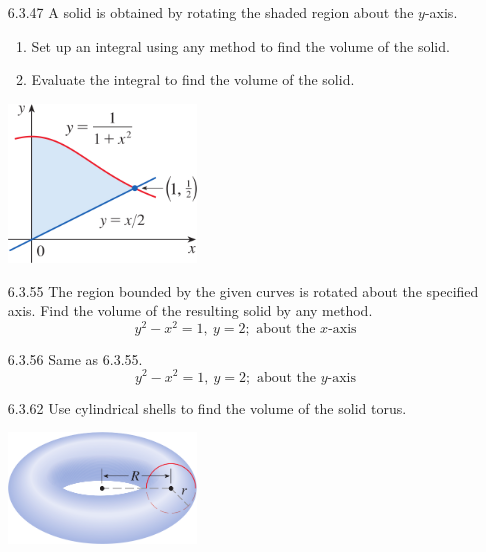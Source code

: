 \documentclass{article}
\begin{document}
\begin{enumerate}
\item[6.3.47]
    A solid is obtained by rotating the shaded region about the $y$-axis.
    \begin{enumerate}
        \item Set up an integral using any method to find the volume of the solid.
        \item Evaluate the integral to find the volume of the solid.
    \end{enumerate}
    \begin{center}
        \includegraphics[width=5cm]{./png/6.3.47.png}
    \end{center}

\vspace{6cm}

\item[6.3.55]
    The region bounded by the given curves is rotated about the specified axis.
    Find the volume of the resulting solid by any method.
    \[
        y^{2}-x^{2}=1,\ y=2; \text{ about the $x$-axis }
    \]

\newpage

\item[6.3.56]
    Same as 6.3.55.
    \[
        y^{2}-x^{2}=1,\ y=2; \text{ about the $y$-axis }
    \]

\vspace{5cm}

\item[6.3.62]
    Use cylindrical shells to find the volume of the solid torus.
    \begin{center}
        \includegraphics[width=5cm]{./png/6.3.62.png}
    \end{center}

\vspace{5cm}


\end{enumerate}
\end{document}
